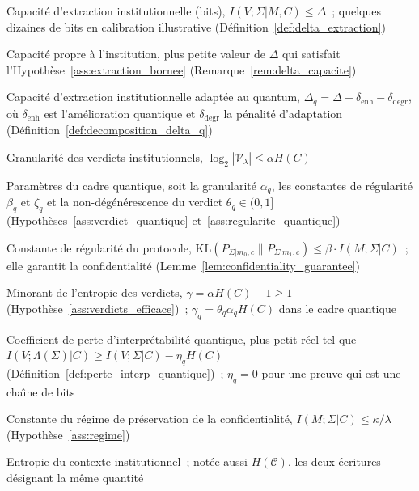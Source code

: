 \begin{sloppypar}
\begin{description}[style=nextline,leftmargin=1.6cm,font=\normalfont\bfseries]
\item[$\Delta$] Capacit\'e d'extraction institutionnelle (bits), $I(V;\Sigma|M,C) \leq \Delta$~; quelques dizaines de bits en calibration illustrative (D\'efinition~\ref{def:delta_extraction})
\item[$\Delta^*$] Capacit\'e propre \`a l'institution, plus petite valeur de $\Delta$ qui satisfait l'Hypoth\`ese~\ref{ass:extraction_bornee} (Remarque~\ref{rem:delta_capacite})
\item[$\Delta_q$] Capacit\'e d'extraction institutionnelle adapt\'ee au quantum, $\Delta_q = \Delta + \delta_{\mathrm{enh}} - \delta_{\mathrm{degr}}$, o\`u $\delta_{\mathrm{enh}}$ est l'am\'elioration quantique et $\delta_{\mathrm{degr}}$ la p\'enalit\'e d'adaptation (D\'efinition~\ref{def:decomposition_delta_q})
\item[$\alpha$] Granularit\'e des verdicts institutionnels, $\log_2|\mathcal{V}_\lambda| \leq \alpha H(C)$
\item[$\alpha_q$, $\beta_q$, $\zeta_q$, $\theta_q$] Param\`etres du cadre quantique, soit la granularit\'e $\alpha_q$, les constantes de r\'egularit\'e $\beta_q$ et $\zeta_q$ et la non-d\'eg\'en\'erescence du verdict $\theta_q \in (0,1]$ (Hypoth\`eses~\ref{ass:verdict_quantique} et~\ref{ass:regularite_quantique})
\item[$\beta$] Constante de r\'egularit\'e du protocole, $\mathrm{KL}(P_{\Sigma|m_0,c}\|P_{\Sigma|m_1,c}) \leq \beta \cdot I(M;\Sigma|C)$~; elle garantit la confidentialit\'e (Lemme~\ref{lem:confidentiality_guarantee})
\item[$\gamma$] Minorant de l'entropie des verdicts, $\gamma = \alpha H(C) - 1 \geq 1$ (Hypoth\`ese~\ref{ass:verdicts_efficace})~; $\gamma_q = \theta_q\alpha_q H(C)$ dans le cadre quantique
\item[$\eta_q$] Coefficient de perte d'interpr\'etabilit\'e quantique, plus petit r\'eel tel que $I(V;\Lambda(\Sigma)|C) \geq I(V;\Sigma|C) - \eta_q H(C)$ (D\'efinition~\ref{def:perte_interp_quantique})~; $\eta_q = 0$ pour une preuve qui est une cha\^{\i}ne de bits
\item[$\kappa$] Constante du r\'egime de pr\'eservation de la confidentialit\'e, $I(M;\Sigma|C) \leq \kappa/\lambda$ (Hypoth\`ese~\ref{ass:regime})
\item[$H(C)$] Entropie du contexte institutionnel~; not\'ee aussi $H(\mathcal{C})$, les deux \'ecritures d\'esignant la m\^eme quantit\'e
\end{description}


\end{sloppypar}
